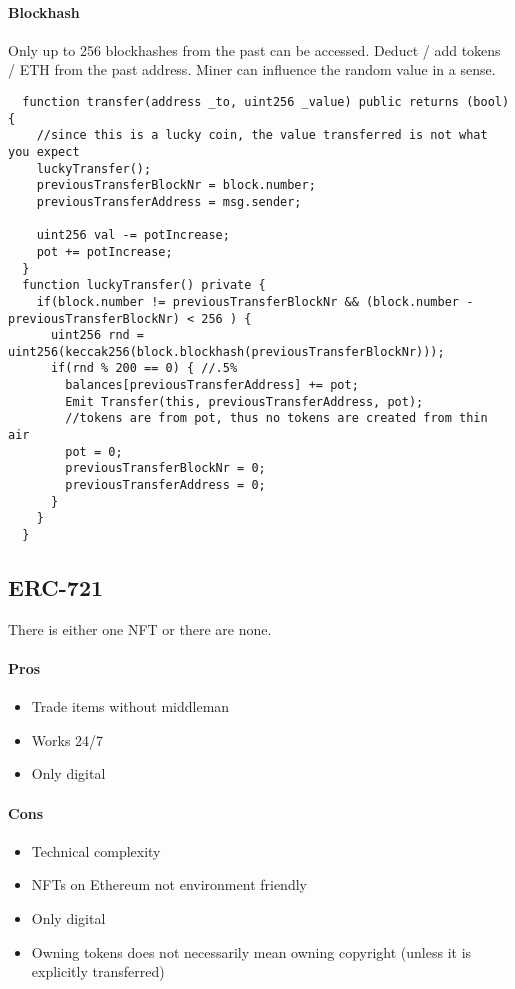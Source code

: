 \paragraph{Blockhash}
Only up to 256 blockhashes from the past can be accessed.
Deduct / add tokens / ETH from the past address.
Miner can influence the random value in a sense.

\begin{lstlisting}
  function transfer(address _to, uint256 _value) public returns (bool) {
    //since this is a lucky coin, the value transferred is not what you expect
    luckyTransfer();
    previousTransferBlockNr = block.number;
    previousTransferAddress = msg.sender;

    uint256 val -= potIncrease;
    pot += potIncrease;
  }
  function luckyTransfer() private {
    if(block.number != previousTransferBlockNr && (block.number - previousTransferBlockNr) < 256 ) {
      uint256 rnd = uint256(keccak256(block.blockhash(previousTransferBlockNr)));
      if(rnd % 200 == 0) { //.5%
        balances[previousTransferAddress] += pot;
        Emit Transfer(this, previousTransferAddress, pot);
        //tokens are from pot, thus no tokens are created from thin air
        pot = 0;
        previousTransferBlockNr = 0;
        previousTransferAddress = 0;
      }
    }
  }
\end{lstlisting}


\subsection{ERC-721}
There is either one NFT or there are none.
\paragraph{Pros}
\begin{itemize}
  \item Trade items without middleman
  \item Works 24/7
  \item Only digital
\end{itemize}
\paragraph{Cons}
\begin{itemize}
  \item Technical complexity
  \item NFTs on Ethereum not environment friendly
  \item Only digital
  \item Owning tokens does not necessarily mean owning copyright (unless it is explicitly transferred)
\end{itemize}

